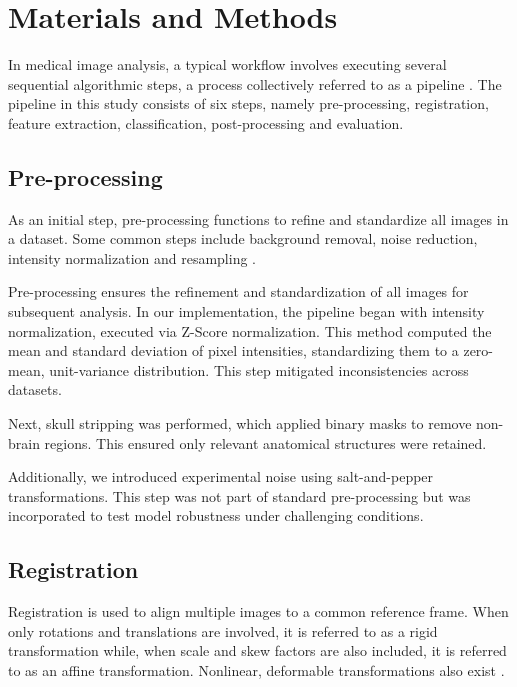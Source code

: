 \section{Materials and Methods}

In medical image analysis, a typical workflow involves executing several sequential algorithmic steps, a process collectively referred to as a pipeline \cite{b8}. The pipeline in this study consists of six steps, namely pre-processing, registration, feature extraction, classification, post-processing and evaluation.

\subsection{Pre-processing}

As an initial step, pre-processing functions to refine and standardize all images in a dataset. Some common steps include background removal, noise reduction, intensity normalization and resampling \cite{b9}.

Pre-processing ensures the refinement and standardization of all images for subsequent analysis. In our implementation, the pipeline began with intensity normalization, executed via Z-Score normalization. This method computed the mean and standard deviation of pixel intensities, standardizing them to a zero-mean, unit-variance distribution. This step mitigated inconsistencies across datasets.

Next, skull stripping was performed, which applied binary masks to remove non-brain regions. This ensured only relevant anatomical structures were retained.

Additionally, we introduced experimental noise using salt-and-pepper transformations. This step was not part of standard pre-processing but was incorporated to test model robustness under challenging conditions.


\subsection{Registration}

Registration is used to align multiple images to a common reference frame. When only rotations and translations are involved, it is referred to as a rigid transformation while, when scale and skew factors are also included, it is referred to as an affine transformation. Nonlinear, deformable transformations also exist \cite{b10}.

